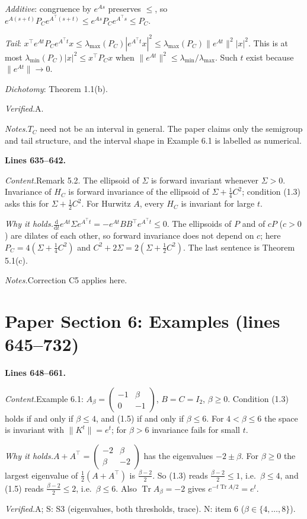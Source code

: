 \documentclass[11pt]{amsart}
\newcommand{\Tr}{\operatorname{Tr}}
\newcommand{\tp}{\top}
\newcommand{\src}[1]{\par\bigskip\noindent\textbf{Lines #1.}\enspace}
\newcommand{\content}{\par\smallskip\noindent\textit{Content.}\enspace}
\newcommand{\why}{\par\smallskip\noindent\textit{Why it holds.}\enspace}
\newcommand{\verified}{\par\smallskip\noindent\textit{Verified.}\enspace}
\newcommand{\notes}{\par\smallskip\noindent\textit{Notes.}\enspace}
\newcommand{\tA}{\textsf{A}}
\newcommand{\tS}{\textsf{S}}
\newcommand{\tN}{\textsf{N}}
\begin{document}
\emph{Additive}: congruence by $e^{As}$ preserves $\le$, so
$e^{A(s+t)}P_Ce^{A^\tp(s+t)}\le e^{As}P_Ce^{A^\tp s}\le P_C$.

\emph{Tail}: $x^\tp e^{At}P_Ce^{A^\tp t}x\le\lambda_{\max}(P_C)|e^{A^\tp t}x|^2\le\lambda_{\max}(P_C)\|e^{At}\|^2|x|^2$.
This is at most $\lambda_{\min}(P_C)|x|^2\le x^\tp P_Cx$ when $\|e^{At}\|^2\le\lambda_{\min}/\lambda_{\max}$. Such $t$
exist because $\|e^{At}\|\to0$.

\emph{Dichotomy}: Theorem 1.1(b).
\verified \tA.
\notes $T_C$ need not be an interval in general. The paper claims only the semigroup and tail structure, and the
interval shape in Example 6.1 is labelled as numerical.

\src{635--642}
\content Remark 5.2. The ellipsoid of $\Sigma$ is forward invariant whenever $\Sigma>0$. Invariance of $H_C$ is forward
invariance of the ellipsoid of $\Sigma+\frac14C^2$; condition (1.3) asks this for $\Sigma+\frac12C^2$. For Hurwitz $A$,
every $H_C$ is invariant for large $t$.
\why $\frac{\mathrm d}{\mathrm dt}e^{At}\Sigma e^{A^\tp t}=-e^{At}BB^\tp e^{A^\tp t}\le0$. The ellipsoids of $P$ and
of $cP$ ($c>0$) are dilates of each other, so forward invariance does not depend on $c$; here
$P_C=4(\Sigma+\frac14C^2)$ and $C^2+2\Sigma=2(\Sigma+\frac12C^2)$. The last sentence is Theorem 5.1(c).
\notes Correction C5 applies here.

\section{Paper Section 6: Examples (lines 645--732)}\label{sec:ex}

\src{648--661}
\content Example 6.1: $A_\beta=\begin{pmatrix}-1&\beta\\0&-1\end{pmatrix}$, $B=C=I_2$, $\beta\ge0$. Condition (1.3)
holds if and only if $\beta\le4$, and (1.5) if and only if $\beta\le6$. For $4<\beta\le6$ the space is invariant with
$\|K^t\|=e^t$; for $\beta>6$ invariance fails for small $t$.
\why $A+A^\tp=\begin{pmatrix}-2&\beta\\\beta&-2\end{pmatrix}$ has the eigenvalues $-2\pm\beta$. For $\beta\ge0$ the
largest eigenvalue of $\frac12(A+A^\tp)$ is $\frac{\beta-2}2$. So (1.3) reads $\frac{\beta-2}2\le1$, i.e.\
$\beta\le4$, and (1.5) reads $\frac{\beta-2}2\le2$, i.e.\ $\beta\le6$. Also $\Tr A_\beta=-2$ gives
$e^{-t\Tr A/2}=e^t$.
\verified \tA; \tS: S3 (eigenvalues, both thresholds, trace). \tN: item 6 ($\beta\in\{4,\dots,8\}$).
\end{document}
